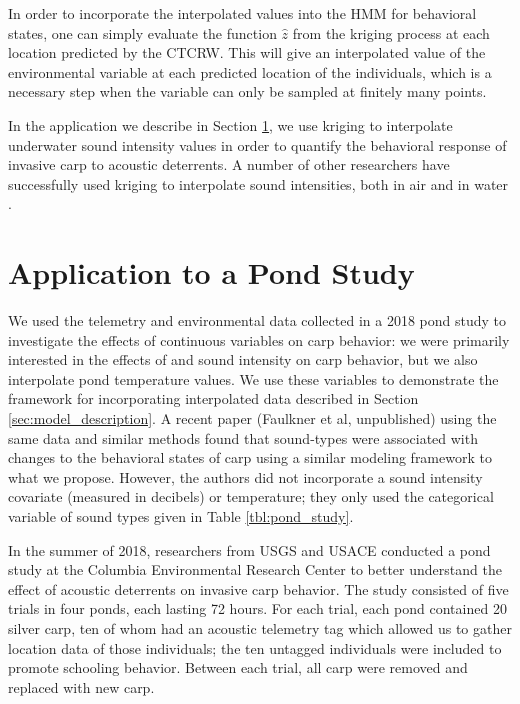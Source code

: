 \documentclass[12pt]{article}
\begin{document}
	In order to incorporate the interpolated values into the HMM for behavioral states, one can simply evaluate the function $\hat z$ from the kriging process at each location predicted by the CTCRW. This will give an interpolated value of the environmental variable at each predicted location of the individuals, which is a necessary step when the variable can only be sampled at finitely many points.
	
	In the application we describe in Section \ref{sec:pond-study}, we use kriging to interpolate underwater sound intensity values in order to quantify the behavioral response of invasive carp to acoustic deterrents. A number of other researchers have successfully used kriging to interpolate sound intensities, both in air \cite{Baume2008, Bostanci2018} and in water \cite{Sun2018}.
	
	\section{Application to a Pond Study} \label{sec:pond-study}
		
	We used the telemetry and environmental data collected in a 2018 pond study to investigate the effects of continuous variables on carp behavior: we were primarily interested in the effects of and sound intensity on carp behavior, but we also interpolate pond temperature values. We use these variables to demonstrate the framework for incorporating interpolated data described in Section \ref{sec:model_description}. A recent paper (Faulkner et al, unpublished) using the same data and similar methods found that sound-types were associated with changes to the behavioral states of carp using a similar modeling framework to what we propose. However, the authors did not incorporate a sound intensity covariate (measured in decibels) or temperature; they only used the categorical variable of sound types given in Table \ref{tbl:pond_study}.
		
	In the summer of 2018, researchers from USGS and USACE conducted a pond study at the Columbia Environmental Research Center to better understand the effect of acoustic deterrents on invasive carp behavior. The study consisted of five trials in four ponds, each lasting 72 hours. For each trial, each pond contained 20 silver carp, ten of whom had an acoustic telemetry tag which allowed us to gather location data of those individuals; the ten untagged individuals were included to promote schooling behavior. Between each trial, all carp were removed and replaced with new carp.
	
\end{document}
